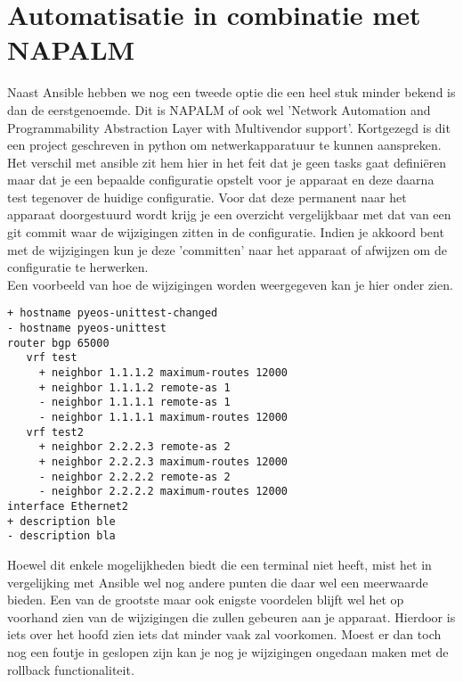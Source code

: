 
\chapter{Automatisatie in combinatie met NAPALM}
\label{ch:napalm}
Naast Ansible hebben we nog een tweede optie die een heel stuk minder bekend is dan de eerstgenoemde. Dit is NAPALM of ook wel 'Network Automation and Programmability Abstraction Layer with Multivendor support'. Kortgezegd is dit een project geschreven in python om netwerkapparatuur te kunnen aanspreken. Het verschil met ansible zit hem hier in het feit dat je geen tasks gaat definiëren maar dat je een bepaalde configuratie opstelt voor je apparaat en deze daarna test tegenover de huidige configuratie. Voor dat deze permanent naar het apparaat doorgestuurd wordt krijg je een overzicht vergelijkbaar met dat van een git commit waar de wijzigingen zitten in de configuratie. Indien je akkoord bent met de wijzigingen kun je deze 'committen' naar het apparaat of afwijzen om de configuratie te herwerken. 
\\

Een voorbeeld van hoe de wijzigingen worden weergegeven kan je hier onder zien.

\begin{center}
\begin{Verbatim}
+ hostname pyeos-unittest-changed
- hostname pyeos-unittest
router bgp 65000
   vrf test
     + neighbor 1.1.1.2 maximum-routes 12000
     + neighbor 1.1.1.2 remote-as 1
     - neighbor 1.1.1.1 remote-as 1
     - neighbor 1.1.1.1 maximum-routes 12000
   vrf test2
     + neighbor 2.2.2.3 remote-as 2
     + neighbor 2.2.2.3 maximum-routes 12000
     - neighbor 2.2.2.2 remote-as 2
     - neighbor 2.2.2.2 maximum-routes 12000
interface Ethernet2
+ description ble
- description bla
\end{Verbatim}
\end{center}

Hoewel dit enkele mogelijkheden biedt die een terminal niet heeft, mist het in vergelijking met Ansible wel nog andere punten die daar wel een meerwaarde bieden. Een van de grootste maar ook enigste voordelen blijft wel het op voorhand zien van de wijzigingen die zullen gebeuren aan je apparaat. Hierdoor is iets over het hoofd zien iets dat minder vaak zal voorkomen. Moest er dan toch nog een foutje in geslopen zijn kan je nog je wijzigingen ongedaan maken met de rollback functionaliteit. 

